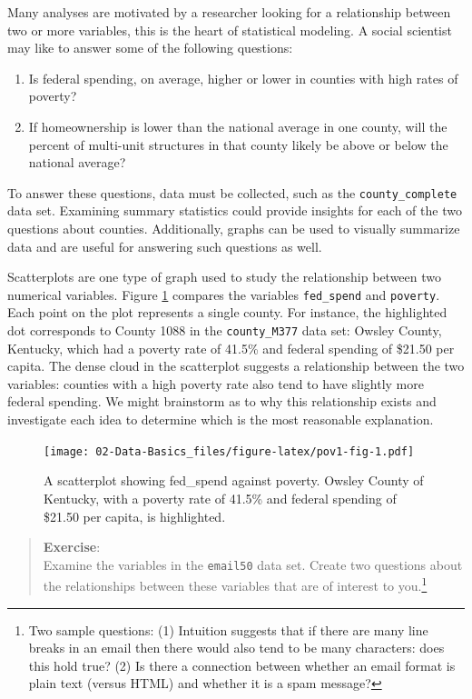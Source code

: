 \documentclass[
]{book}
\providecommand{\tightlist}{%
  \setlength{\itemsep}{0pt}\setlength{\parskip}{0pt}}
\begin{document}
Many analyses are motivated by a researcher looking for a relationship between two or more variables, this is the heart of statistical modeling. A social scientist may like to answer some of the following questions:

\begin{enumerate}
\def\labelenumi{\arabic{enumi}.}
\tightlist
\item
  Is federal spending, on average, higher or lower in counties with high rates of poverty?\\
\item
  If homeownership is lower than the national average in one county, will the percent of multi-unit structures in that county likely be above or below the national average?
\end{enumerate}

To answer these questions, data must be collected, such as the \texttt{county\_complete} data set. Examining summary statistics could provide insights for each of the two questions about counties. Additionally, graphs can be used to visually summarize data and are useful for answering such questions as well.

Scatterplots are one type of graph used to study the relationship between two numerical variables. Figure \ref{fig:pov1-fig} compares the variables \texttt{fed\_spend} and \texttt{poverty}. Each point on the plot represents a single county. For instance, the highlighted dot corresponds to County 1088 in the \texttt{county\_M377} data set: Owsley County, Kentucky, which had a poverty rate of 41.5\% and federal spending of \$21.50 per capita. The dense cloud in the scatterplot suggests a relationship between the two variables: counties with a high poverty rate also tend to have slightly more federal spending. We might brainstorm as to why this relationship exists and investigate each idea to determine which is the most reasonable explanation.

\begin{figure}
\centering
\texttt{[image: 02-Data-Basics\_files/figure-latex/pov1-fig-1.pdf]}
\caption{\label{fig:pov1-fig}A scatterplot showing fed\_spend against poverty. Owsley County of Kentucky, with a poverty rate of 41.5\% and federal spending of \$21.50 per capita, is highlighted.}
\end{figure}

\begin{quote}
\textbf{Exercise}:\\
Examine the variables in the \texttt{email50} data set. Create two questions about the relationships between these variables that are of interest to you.\footnote{Two sample questions: (1) Intuition suggests that if there are many line breaks in an email then there would also tend to be many characters: does this hold true? (2) Is there a connection between whether an email format is plain text (versus HTML) and whether it is a spam message?}
\end{quote}
\end{document}
